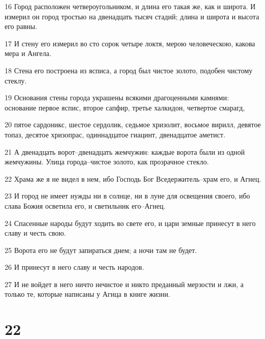 \par 16 Город расположен четвероугольником, и длина его такая же, как и широта. И измерил он город тростью на двенадцать тысяч стадий; длина и широта и высота его равны.
\par 17 И стену его измерил во сто сорок четыре локтя, мерою человеческою, какова мера и Ангела.
\par 18 Стена его построена из ясписа, а город был чистое золото, подобен чистому стеклу.
\par 19 Основания стены города украшены всякими драгоценными камнями: основание первое яспис, второе сапфир, третье халкидон, четвертое смарагд,
\par 20 пятое сардоникс, шестое сердолик, седьмое хризолит, восьмое вирилл, девятое топаз, десятое хризопрас, одиннадцатое гиацинт, двенадцатое аметист.
\par 21 А двенадцать ворот--двенадцать жемчужин: каждые ворота были из одной жемчужины. Улица города--чистое золото, как прозрачное стекло.
\par 22 Храма же я не видел в нем, ибо Господь Бог Вседержитель--храм его, и Агнец.
\par 23 И город не имеет нужды ни в солнце, ни в луне для освещения своего, ибо слава Божия осветила его, и светильник его--Агнец.
\par 24 Спасенные народы будут ходить во свете его, и цари земные принесут в него славу и честь свою.
\par 25 Ворота его не будут запираться днем; а ночи там не будет.
\par 26 И принесут в него славу и честь народов.
\par 27 И не войдет в него ничто нечистое и никто преданный мерзости и лжи, а только те, которые написаны у Агнца в книге жизни.

\chapter{22}

